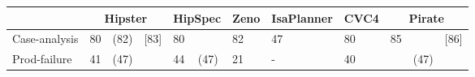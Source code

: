 
\begin{tabularx}{\textwidth}{l | X X X | X X | X | X | X | X X X}
  & \multicolumn{3}{|c|}{Hipster}
  	& \multicolumn{2}{c|}{HipSpec}
  	& \multicolumn{1}{c|}{Zeno}
  	& \multicolumn{1}{c|}{IsaPlanner}
  	& \multicolumn{1}{c|}{CVC4}
  	& \multicolumn{3}{c}{Pirate} \\
  \hline
  Case-analysis & 80 & (82) & [83] & 80 & & 82 & 47 & 80 & 85 & & [86] \\
  Prod-failure & 41 & (47) & & 44 & (47) & 21 & - & 40 & & (47) & \\
\end{tabularx}





